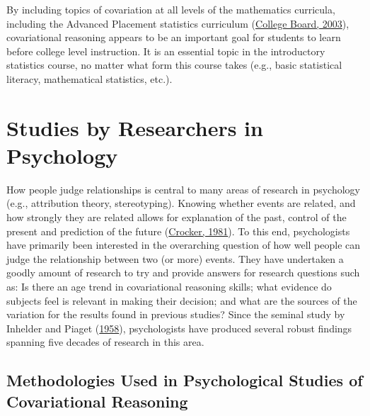 \documentclass[11pt]{umnthesis}
\begin{document}
By including topics of covariation at all levels of the mathematics curricula, including the Advanced Placement statistics curriculum (\protect\hyperlink{ref-college-board:2003}{College Board, 2003}), covariational reasoning appears to be an important goal for students to learn before college level instruction. It is an essential topic in the introductory statistics course, no matter what form this course takes (e.g., basic statistical literacy, mathematical statistics, etc.).

\hypertarget{studies-by-researchers-in-psychology}{%
\section{Studies by Researchers in Psychology}\label{studies-by-researchers-in-psychology}}

How people judge relationships is central to many areas of research in psychology (e.g., attribution theory, stereotyping). Knowing whether events are related, and how strongly they are related allows for explanation of the past, control of the present and prediction of the future (\protect\hyperlink{ref-crocker:1981}{Crocker, 1981}). To this end, psychologists have primarily been interested in the overarching question of how well people can judge the relationship between two (or more) events. They have undertaken a goodly amount of research to try and provide answers for research questions such as: Is there an age trend in covariational reasoning skills; what evidence do subjects feel is relevant in making their decision; and what are the sources of the variation for the results found in previous studies? Since the seminal study by Inhelder and Piaget (\protect\hyperlink{ref-inhelder:1958}{1958}), psychologists have produced several robust findings spanning five decades of research in this area.

\hypertarget{methodologies-used-in-psychological-studies-of-covariational-reasoning}{%
\subsection{Methodologies Used in Psychological Studies of Covariational Reasoning}\label{methodologies-used-in-psychological-studies-of-covariational-reasoning}}
\end{document}
